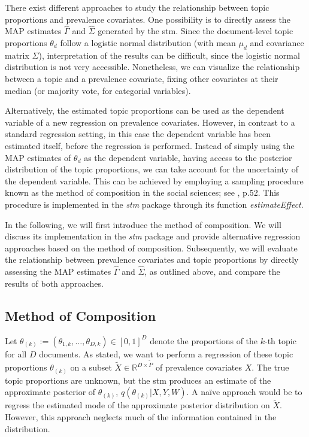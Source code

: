 There exist different approaches to study the relationship between topic proportions and prevalence covariates. One possibility is to directly assess the MAP estimates $\hat{\Gamma}$ and $\hat{\Sigma}$ generated by the stm. Since the document-level topic proportions $\theta_d$ follow a logistic normal distribution (with mean $\mu_d$ and covariance matrix $\Sigma$), interpretation of the results can be difficult, since the logistic normal distribution is not very accessible. Nonetheless, we can visualize the relationship between a topic and a prevalence covariate, fixing other covariates at their median (or majority vote, for categorial variables).

Alternatively, the estimated topic proportions can be used as the dependent variable of a new regression on prevalence covariates. However, in contrast to a standard regression setting, in this case the dependent variable has been estimated itself, before the regression is performed. Instead of simply using the MAP estimates of $\theta_d$ as the dependent variable, having access to the posterior distribution of the topic proportions, we can take account for the uncertainty of the dependent variable. This can be achieved by employing a sampling procedure known as the method of composition in the social sciences; see \cite{tanner2012tools}, p.52. This procedure is implemented in the \textit{stm} package through its function \textit{estimateEffect}.

In the following, we will first introduce the method of composition. We will discuss its implementation in the \textit{stm} package and provide alternative regression approaches based on the method of composition. Subsequently, we will evaluate the relationship between prevalence covariates and topic proportions by directly assessing the MAP estimates $\hat{\Gamma}$ and $\hat{\Sigma}$, as outlined above, and compare the results of both approaches.

\subsection{Method of Composition}

Let $\theta_{(k)}:=(\theta_{1,k}, \dots, \theta_{D,k}) \in [0,1]^{D}$ denote the proportions of the $k$-th topic for all $D$ documents. As stated, we want to perform a regression of these topic proportions $\theta_{(k)}$ on a subset $\tilde{X} \in \mathbb{R}^{D \times \tilde{P}}$ of prevalence covariates $X$. The true topic proportions are unknown, but the stm produces an estimate of the approximate posterior of $\theta_{(k)}$, $q(\theta_{(k)} | X, Y, W)$. A naïve approach would be to regress the estimated mode of the approximate posterior distribution on $\tilde{X}$. However, this approach neglects much of the information contained in the distribution. 

